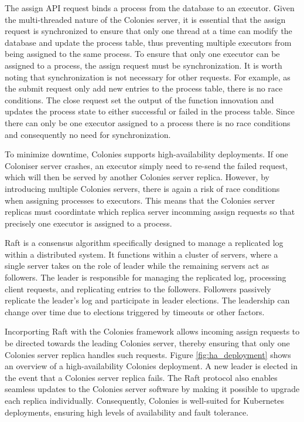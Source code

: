 \documentclass{article}
\begin{document}
The assign API request binds a process from the database to an executor. Given the multi-threaded nature of the Colonies server, it is essential that the assign request is synchronized to ensure that only one thread at a time can modify the database and update the process table, thus preventing multiple executors from being assigned to the same process. To ensure that only one executor can be assigned to a process, the assign request must be synchronization. It is worth noting that synchronization is not necessary for other requests. For example, as the submit request only add new entries to the process table, there is no race conditions. The close request set the output of the function innovation and updates the process state to either successful or failed in the process table. Since there can only be one executor assigned to a process there is no race conditions and consequently no need for synchronization.

To minimize downtime, Colonies supports high-availability deployments. If one Coloniser server crashes, an executor simply need to re-send the failed request, which will then be served by another Colonies server replica. However, by introducing multiple Colonies servers, there is again a risk of race conditions when assigning processes to executors. This means that the Colonies server replicas must coordintate which replica server incomming assign requests so that precisely one executor is assigned to a process.

Raft \cite{raft} is a consensus algorithm specifically designed to manage a replicated log within a distributed system. It functions within a cluster of servers, where a single server takes on the role of leader while the remaining servers act as followers. The leader is responsible for managing the replicated log, processing client requests, and replicating entries to the followers. Followers passively replicate the leader's log and participate in leader elections. The leadership can change over time due to elections triggered by timeouts or other factors.

Incorporting Raft with the Colonies framework allows incoming assign requests to be directed towards the leading Colonies server, thereby ensuring that only one Colonies server replica handles such requests. Figure \ref{fig:ha_deployment} shows an overview of a high-availability Colonies deployment. A new leader is elected in the event that a Colonies server replica fails. The Raft protocol also enables seamless updates to the Colonies server software by making it possible to upgrade each replica individually. Consequently, Colonies is well-suited for Kubernetes deployments, ensuring high levels of availability and fault tolerance.
\end{document}
